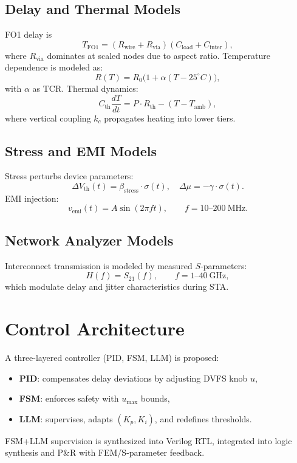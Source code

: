 \documentclass[conference]{IEEEtran}
\begin{document}
\subsection{Delay and Thermal Models}
FO1 delay is
\begin{equation}
T_{\mathrm{FO1}}=(R_{\mathrm{wire}}+R_{\mathrm{via}})(C_{\mathrm{load}}+C_{\mathrm{inter}}),
\end{equation}
where $R_{\mathrm{via}}$ dominates at scaled nodes due to aspect ratio. Temperature dependence is modeled as:
\begin{equation}
R(T)=R_0\bigl(1+\alpha(T-25^{\circ}C)\bigr),
\end{equation}
with $\alpha$ as TCR. Thermal dynamics:
\begin{equation}
C_{\mathrm{th}}\frac{dT}{dt}=P\cdot R_{\mathrm{th}}-(T-T_{\mathrm{amb}}),
\end{equation}
where vertical coupling $k_c$ propagates heating into lower tiers.

\subsection{Stress and EMI Models}
Stress perturbs device parameters:
\begin{equation}
\Delta V_{\mathrm{th}}(t)=\beta_{\mathrm{stress}}\cdot\sigma(t),\quad \Delta\mu=-\gamma\cdot\sigma(t).
\end{equation}
EMI injection:
\begin{equation}
v_{\mathrm{emi}}(t)=A\sin(2\pi f t),\qquad f=10\text{--}200~\mathrm{MHz}.
\end{equation}

\subsection{Network Analyzer Models}
Interconnect transmission is modeled by measured $S$-parameters:
\begin{equation}
H(f)=S_{21}(f),\qquad f=1\text{--}40~\mathrm{GHz},
\end{equation}
which modulate delay and jitter characteristics during STA.

\section{Control Architecture}
A three-layered controller (PID, FSM, LLM) is proposed:
\begin{itemize}
\item \textbf{PID}: compensates delay deviations by adjusting DVFS knob $u$,
\item \textbf{FSM}: enforces safety with $u_{\max}$ bounds,
\item \textbf{LLM}: supervises, adapts $(K_p,K_i)$, and redefines thresholds.
\end{itemize}
FSM+LLM supervision is synthesized into Verilog RTL, integrated into logic synthesis and P\&R with FEM/S-parameter feedback.
\end{document}

